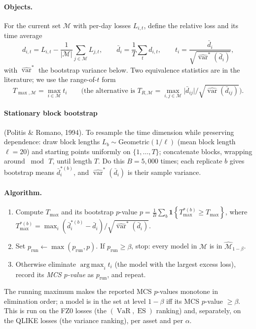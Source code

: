 \documentclass[11pt,a4paper]{article}
\newcommand{\Ind}[1]{\mathbf{1}\!\left\{#1\right\}}
\newcommand{\VaR}{\operatorname{VaR}}
\newcommand{\ES}{\operatorname{ES}}
\newcommand{\Mcal}{\mathcal{M}}
\DeclareMathOperator*{\argmax}{arg\,max}
\begin{document}
\paragraph{Objects.} For the current set $\Mcal$ with per-day losses
$L_{i,t}$, define the relative loss and its time average
\begin{equation}
  d_{i,t} = L_{i,t} - \frac{1}{|\Mcal|}\sum_{j\in\Mcal} L_{j,t},
  \qquad
  \bar d_i = \frac1T\sum_t d_{i,t},
  \qquad
  t_i = \frac{\bar d_i}{\sqrt{\widehat{\operatorname{var}}^{\ast}(\bar d_i)}},
\end{equation}
with $\widehat{\operatorname{var}}^{\ast}$ the bootstrap variance below. Two
equivalence statistics are in the literature; we use the range-of-$t$ form
\begin{equation}
  T_{\max,\Mcal} = \max_{i\in\Mcal} t_i
  \qquad\Big(\text{the alternative is } T_{R,\Mcal}=\max_{i,j\in\Mcal}\big|\bar d_{ij}\big|/\sqrt{\widehat{\operatorname{var}}(\bar d_{ij})}\Big).
\end{equation}

\paragraph{Stationary block bootstrap} (Politis \& Romano, 1994). To resample
the time dimension while preserving dependence: draw block lengths
$L_b\sim\text{Geometric}(1/\ell)$ (mean block length $\ell = 20$) and starting
points uniformly on $\{1,\dots,T\}$; concatenate blocks, wrapping around
$\bmod\,T$, until length $T$. Do this $B = 5{,}000$ times; each replicate
$b$ gives bootstrap means $\bar d_i^{\ast(b)}$, and
$\widehat{\operatorname{var}}^{\ast}(\bar d_i)$ is their sample variance.

\paragraph{Algorithm.}
\begin{enumerate}[nosep]
\item Compute $T_{\max}$ and its bootstrap $p$-value
      $p = \tfrac1B\sum_b \Ind{T_{\max}^{\ast(b)} \ge T_{\max}}$, where
      $T_{\max}^{\ast(b)} = \max_i (\bar d_i^{\ast(b)} - \bar d_i)/
      \sqrt{\widehat{\operatorname{var}}^{\ast}(\bar d_i)}$.
\item Set $p_{\text{run}}\leftarrow\max(p_{\text{run}}, p)$. If
      $p_{\text{run}}\ge\beta$, stop: every model in $\Mcal$ is in
      $\widehat{\Mcal}_{1-\beta}$.
\item Otherwise eliminate $\argmax_i t_i$ (the model with the largest excess
      loss), record its \emph{MCS $p$-value} as $p_{\text{run}}$, and repeat.
\end{enumerate}
The running maximum makes the reported MCS $p$-values monotone in elimination
order; a model is in the set at level $1-\beta$ iff its MCS $p$-value
$\ge\beta$. This is run on the FZ0 losses (the $(\VaR,\ES)$ ranking) and,
separately, on the QLIKE losses (the variance ranking), per asset and per
$\alpha$.
\end{document}
